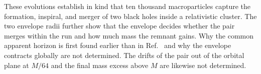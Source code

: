 These evolutions establish in kind that ten thousand macroparticles capture the formation, inspiral, and merger of two black holes inside a relativistic cluster. The two envelope radii further show that the envelope decides whether the pair merges within the run and how much mass the remnant gains. Why the common apparent horizon is first found earlier than in Ref.~\cite{Wu:2026nrpic} and why the envelope contracts globally are not determined. The drifts of the pair out of the orbital plane at $M/64$ and the final mass excess above $M$ are likewise not determined.
